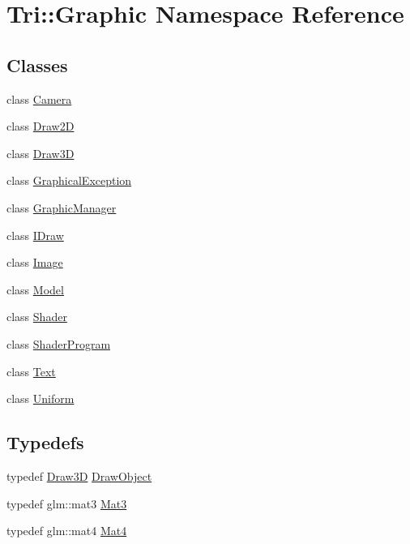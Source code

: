 \hypertarget{namespace_tri_1_1_graphic}{}\section{Tri\+:\+:Graphic Namespace Reference}
\label{namespace_tri_1_1_graphic}
\subsection*{Classes}
\begin{DoxyCompactItemize}
\item 
class \hyperlink{class_tri_1_1_graphic_1_1_camera}{Camera}
\item 
class \hyperlink{class_tri_1_1_graphic_1_1_draw2_d}{Draw2\+D}
\item 
class \hyperlink{class_tri_1_1_graphic_1_1_draw3_d}{Draw3\+D}
\item 
class \hyperlink{class_tri_1_1_graphic_1_1_graphical_exception}{Graphical\+Exception}
\item 
class \hyperlink{class_tri_1_1_graphic_1_1_graphic_manager}{Graphic\+Manager}
\item 
class \hyperlink{class_tri_1_1_graphic_1_1_i_draw}{I\+Draw}
\item 
class \hyperlink{class_tri_1_1_graphic_1_1_image}{Image}
\item 
class \hyperlink{class_tri_1_1_graphic_1_1_model}{Model}
\item 
class \hyperlink{class_tri_1_1_graphic_1_1_shader}{Shader}
\item 
class \hyperlink{class_tri_1_1_graphic_1_1_shader_program}{Shader\+Program}
\item 
class \hyperlink{class_tri_1_1_graphic_1_1_text}{Text}
\item 
class \hyperlink{class_tri_1_1_graphic_1_1_uniform}{Uniform}
\end{DoxyCompactItemize}
\subsection*{Typedefs}
\begin{DoxyCompactItemize}
\item 
typedef \hyperlink{class_tri_1_1_graphic_1_1_draw3_d}{Draw3\+D} \hyperlink{namespace_tri_1_1_graphic_a86845025cd0deaa30d11479d9bbc58a5}{Draw\+Object}
\item 
typedef glm\+::mat3 \hyperlink{namespace_tri_1_1_graphic_a31c7db008856f7e7bbef878577df5be4}{Mat3}
\item 
typedef glm\+::mat4 \hyperlink{namespace_tri_1_1_graphic_a7b3538cdaff9bf96489c56a4f48a5f9a}{Mat4}
\end{DoxyCompactItemize}
